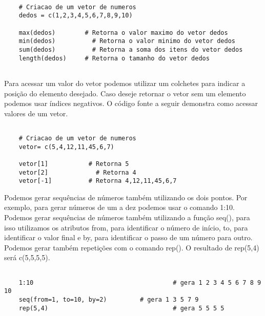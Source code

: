 \begin{scriptsize}
	\estiloR
	\begin{lstlisting}[]
	
	# Criacao de um vetor de numeros
	dedos = c(1,2,3,4,5,6,7,8,9,10)
	
	max(dedos)        # Retorna o valor maximo do vetor dedos
	min(dedos)		    # Retorna o valor minimo do vetor dedos
	sum(dedos)		    # Retorna a soma dos itens do vetor dedos
	length(dedos)     # Retorna o tamanho do vetor dedos
	
	\end{lstlisting}
\end{scriptsize}

Para acessar um valor do vetor podemos utilizar um colchetes para indicar a posição do elemento desejado. Caso deseje retornar o vetor sem um elemento podemos usar índices negativos. O código fonte a seguir demonstra como acessar valores de um vetor.


\begin{scriptsize}
	\estiloR
	\begin{lstlisting}[]
	
	# Criacao de um vetor de numeros
	vetor= c(5,4,12,11,45,6,7)
	
	vetor[1]           # Retorna 5
	vetor[2]    	     # Retorna 4
	vetor[-1]          # Retorna 4,12,11,45,6,7
	\end{lstlisting}
\end{scriptsize}

Podemos gerar sequências de números também utilizando os dois pontos. Por exemplo, para gerar números de um a dez podemos usar o comando 1:10. Podemos gerar sequências de números também utilizando a função seq(), para isso utilizamos os atributos from, para identificar o número de início, to, para identificar o valor final e by, para identificar o passo de um número para outro. Podemos gerar também repetições com o comando rep(). O resultado de rep(5,4) será c(5,5,5,5).

\begin{scriptsize}
	\estiloR
	\begin{lstlisting}[caption={Criação de um vetor em R}, label=lst:rcode]
	
	1:10 					                  # gera 1 2 3 4 5 6 7 8 9 10
	seq(from=1, to=10, by=2)         # gera 1 3 5 7 9
	rep(5,4)				                  # gera 5 5 5 5
	
	\end{lstlisting}
\end{scriptsize}

